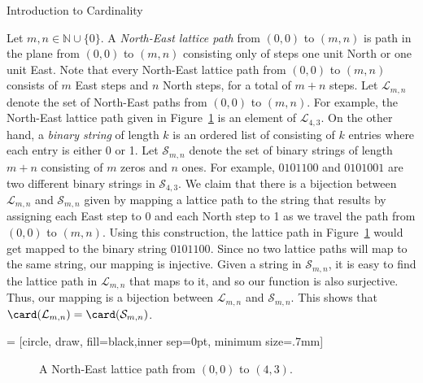 \begin{section}{Introduction to Cardinality}
\begin{example}
Let $m,n\in\mathbb{N}\cup\{0\}$. A \emph{North-East lattice path} from $(0,0)$ to $(m,n)$ is path in the plane from $(0,0)$ to $(m,n)$ consisting only of steps one unit North or one unit East. Note that every North-East lattice path from $(0,0)$ to $(m,n)$ consists of $m$ East steps and $n$ North steps, for a total of $m+n$ steps.  
Let $\mathcal{L}_{m,n}$ denote the set of North-East paths from $(0,0)$ to $(m,n)$. For example, the North-East lattice path given in Figure~\ref{fig:lattice path} is an element of $\mathcal{L}_{4,3}$. On the other hand, a \emph{binary string} of length $k$ is an ordered list of consisting of $k$ entries where each entry is either 0 or 1.  Let $\mathcal{S}_{m,n}$ denote the set of binary strings of length $m+n$ consisting of $m$ zeros and $n$ ones. For example, $0101100$ and $0101001$ are two different binary strings in $\mathcal{S}_{4,3}$. We claim that there is a bijection between $\mathcal{L}_{m,n}$ and $\mathcal{S}_{m,n}$ given by mapping a lattice path to the string that results by assigning each East step to 0 and each North step to 1 as we travel the path from $(0,0)$ to $(m,n)$.  Using this construction, the lattice path in Figure~\ref{fig:lattice path} would get mapped to the binary string $0101100$. Since no two lattice paths will map to the same string, our mapping is injective.  Given a string in $\mathcal{S}_{m,n}$, it is easy to find the lattice path in $\mathcal{L}_{m,n}$ that maps to it, and so our function is also surjective.  Thus, our mapping is a bijection between $\mathcal{L}_{m,n}$ and $\mathcal{S}_{m,n}$.  This shows that $\card(\mathcal{L}_{m,n})=\card(\mathcal{S}_{m,n})$.
\end{example}

 = [circle, draw, fill=black,inner sep=0pt, minimum size=.7mm]

\begin{figure}[h!]
\centering
{}
\caption{A North-East lattice path from $(0,0)$ to $(4,3)$.}\label{fig:lattice path}
\end{figure}


\end{section}
